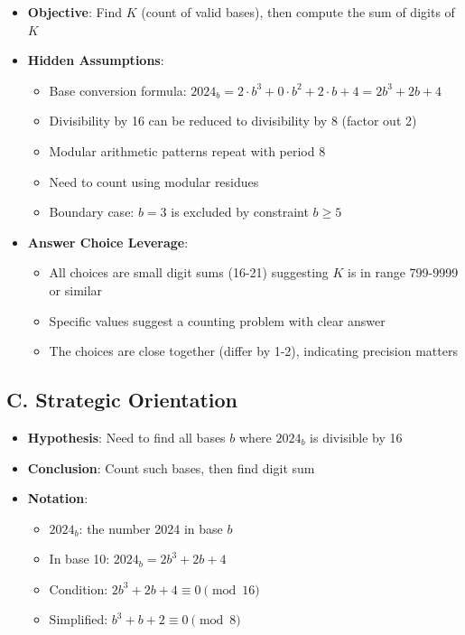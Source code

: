 \documentclass[11pt]{article}
\begin{document}
\begin{problemconfigbox}
\begin{itemize}[leftmargin=*]
    \item \textbf{Objective}: Find $K$ (count of valid bases), then compute the sum of digits of $K$
    
    \item \textbf{Hidden Assumptions}: 
    \begin{itemize}
        \item Base conversion formula: $2024_b = 2 \cdot b^3 + 0 \cdot b^2 + 2 \cdot b + 4 = 2b^3 + 2b + 4$
        \item Divisibility by 16 can be reduced to divisibility by 8 (factor out 2)
        \item Modular arithmetic patterns repeat with period 8
        \item Need to count using modular residues
        \item Boundary case: $b = 3$ is excluded by constraint $b \geq 5$
    \end{itemize}
    
    \item \textbf{Answer Choice Leverage}: 
    \begin{itemize}
        \item All choices are small digit sums (16-21) suggesting $K$ is in range 799-9999 or similar
        \item Specific values suggest a counting problem with clear answer
        \item The choices are close together (differ by 1-2), indicating precision matters
    \end{itemize}
\end{itemize}

\subsection*{C. Strategic Orientation}
\begin{itemize}[leftmargin=*]
    \item \textbf{Hypothesis}: Need to find all bases $b$ where $2024_b$ is divisible by 16
    \item \textbf{Conclusion}: Count such bases, then find digit sum
    \item \textbf{Notation}: 
    \begin{itemize}
        \item $2024_b$: the number 2024 in base $b$
        \item In base 10: $2024_b = 2b^3 + 2b + 4$
        \item Condition: $2b^3 + 2b + 4 \equiv 0 \pmod{16}$
        \item Simplified: $b^3 + b + 2 \equiv 0 \pmod{8}$
    \end{itemize}
    

\end{itemize}
\end{problemconfigbox}
\end{document}
